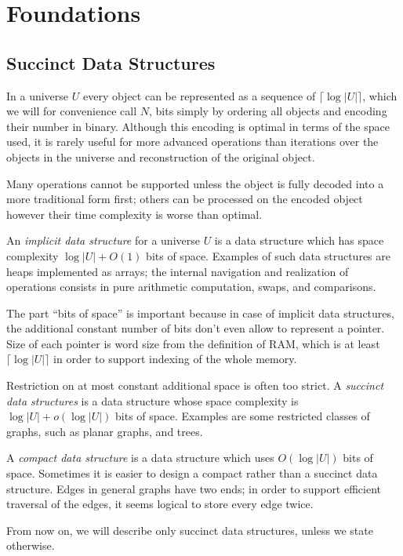 \chapter{Foundations}


\section{Succinct Data Structures}

In a universe $U$ every object can be represented as a sequence of $\lceil \log |U| \rceil$, which we will for convenience call $N$, bits simply by ordering all objects and encoding their number in binary.
Although this encoding is optimal in terms of the space used, it is rarely useful for more advanced operations than iterations over the objects in the universe and reconstruction of the original object.

Many operations cannot be supported unless the object is fully decoded into a more traditional form first; others can be processed on the encoded object however their time complexity is worse than optimal.

An \emph{implicit data structure} for a universe $U$ is a data structure which has space complexity $ \log |U| + O(1) $ bits of space.
Examples of such data structures are heaps implemented as arrays; the internal navigation and realization of operations consists in pure arithmetic computation, swaps, and comparisons.

The part ``bits of space'' is important because in case of implicit data structures, the additional constant number of bits don't even allow to represent a pointer.
Size of each pointer is word size from the definition of RAM, which is at least $\lceil \log |U| \rceil$ in order to support indexing of the whole memory.

Restriction on at most constant additional space is often too strict.
A \emph{succinct data structures} is a data structure whose space complexity is $ \log |U| + o(\log |U|) $ bits of space.
Examples are some restricted classes of graphs, such as planar graphs, and trees.

A \emph{compact data structure} is a data structure which uses $ O(\log |U|) $ bits of space.
Sometimes it is easier to design a compact rather than a succinct data structure.
Edges in general graphs have two ends; in order to support efficient traversal of the edges, it seems logical to store every edge twice.

From now on, we will describe only succinct data structures, unless we state otherwise.

